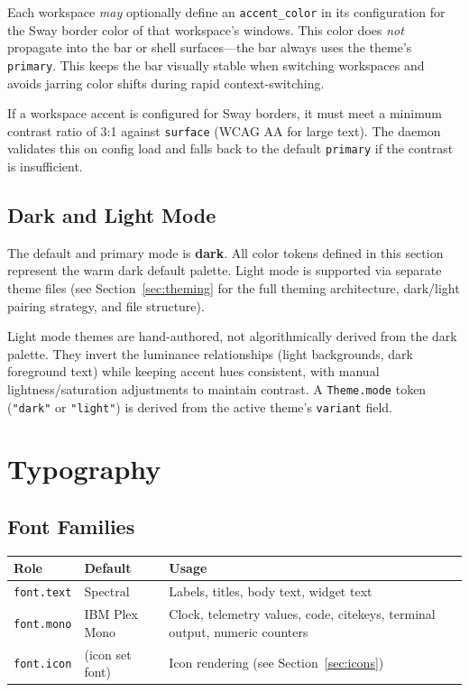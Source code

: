 \documentclass[11pt,a4paper]{article}
\begin{document}
Each workspace \emph{may} optionally define an \texttt{accent\_color} in its configuration for the Sway border color of that workspace's windows. This color does \emph{not} propagate into the bar or shell surfaces---the bar always uses the theme's \texttt{primary}. This keeps the bar visually stable when switching workspaces and avoids jarring color shifts during rapid context-switching.

If a workspace accent is configured for Sway borders, it must meet a minimum contrast ratio of 3:1 against \texttt{surface} (WCAG AA for large text). The daemon validates this on config load and falls back to the default \texttt{primary} if the contrast is insufficient.

\subsection{Dark and Light Mode}

The default and primary mode is \textbf{dark}. All color tokens defined in this section represent the warm dark default palette. Light mode is supported via separate theme files (see Section~\ref{sec:theming} for the full theming architecture, dark/light pairing strategy, and file structure).

Light mode themes are hand-authored, not algorithmically derived from the dark palette. They invert the luminance relationships (light backgrounds, dark foreground text) while keeping accent hues consistent, with manual lightness/saturation adjustments to maintain contrast. A \texttt{Theme.mode} token (\texttt{"dark"} or \texttt{"light"}) is derived from the active theme's \texttt{variant} field.


\section{Typography}
\label{sec:typography}

\subsection{Font Families}

\begin{longtable}{p{3cm} p{3.5cm} p{7cm}}
\toprule
\textbf{Role} & \textbf{Default} & \textbf{Usage} \\
\midrule
\texttt{font.text} & Spectral & Labels, titles, body text, widget text \\
\texttt{font.mono} & IBM Plex Mono & Clock, telemetry values, code, citekeys, terminal output, numeric counters \\
\texttt{font.icon} & (icon set font) & Icon rendering (see Section~\ref{sec:icons}) \\
\bottomrule
\end{longtable}
\end{document}
